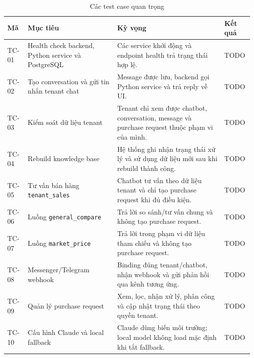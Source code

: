 \documentclass[../DoAn.tex]{subfiles}
\begin{document}
\begin{table}[H]
\centering
\caption{Các test case quan trọng}
\label{tab:ch4-test-cases-main}
\begin{tabular}{|p{}|p{}|p{}|p{}|}
\hline
\textbf{Mã} & \textbf{Mục tiêu} & \textbf{Kỳ vọng} & \textbf{Kết quả} \\
\hline
TC-01 & Health check backend, Python service và PostgreSQL & Các service khởi động và endpoint health trả trạng thái hợp lệ. & TODO \\
\hline
TC-02 & Tạo conversation và gửi tin nhắn tenant chat & Message được lưu, backend gọi Python service và trả reply về UI. & TODO \\
\hline
TC-03 & Kiểm soát dữ liệu tenant & Tenant chỉ xem được chatbot, conversation, message và purchase request thuộc phạm vi của mình. & TODO \\
\hline
TC-04 & Rebuild knowledge base & Hệ thống ghi nhận trạng thái xử lý và sử dụng dữ liệu mới sau khi rebuild thành công. & TODO \\
\hline
TC-05 & Tư vấn bán hàng \texttt{tenant\_sales} & Chatbot tư vấn theo dữ liệu tenant và chỉ tạo purchase request khi đủ điều kiện. & TODO \\
\hline
TC-06 & Luồng \texttt{general\_compare} & Trả lời so sánh/tư vấn chung và không tạo purchase request. & TODO \\
\hline
TC-07 & Luồng \texttt{market\_price} & Trả lời trong phạm vi dữ liệu tham chiếu và không tạo purchase request. & TODO \\
\hline
TC-08 & Messenger/Telegram webhook & Binding đúng tenant/chatbot, nhận webhook và gửi phản hồi qua kênh tương ứng. & TODO \\
\hline
TC-09 & Quản lý purchase request & Xem, lọc, nhận xử lý, phân công và cập nhật trạng thái theo quyền tenant. & TODO \\
\hline
TC-10 & Cấu hình Claude và local fallback & Claude dùng biến môi trường; local model không load mặc định khi tắt fallback. & TODO \\
\hline
\end{tabular}
\end{table}

%
%
%
%
\end{document}
